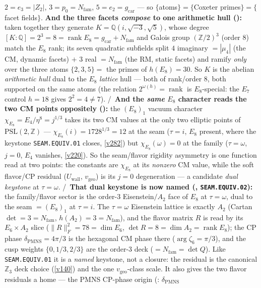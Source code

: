 \documentclass[11pt,a4paper]{article}
\newcommand{\gcar}{g_{\mathrm{car}}}
\newcommand{\Nfam}{N_{\mathrm{fam}}}
\begin{document}
$2{=}e_3{=}|Z_2|$, $3{=}p_0{=}\Nfam$, $5{=}e_2{=}\gcar$ --- so $\{$atoms$\}=\{$Coxeter primes$\}=\{$facet fields$\}$.
\textbf{And the three facets \emph{compose} to one arithmetic hull ():} taken
together they generate $K=\mathbb Q(i,\sqrt{-3},\sqrt5)$, whose degree $[K:\mathbb Q]=2^3=8=\operatorname{rank}E_8
=\gcar{+}\Nfam$ and Galois group $(\mathbb Z/2)^3$ (order $8$) match the $E_8$ rank; its seven quadratic subfields
split $4$ imaginary $=|\mu_4|$ (the CM, dynamic facets) $+$ $3$ real $=\Nfam$ (the RM, static facets) and ramify
\emph{only} over the three atoms $\{2,3,5\}=$ the primes of $h(E_8)=30$. So $K$ is the abelian \emph{arithmetic
hull} dual to the $E_8$ \emph{lattice} hull --- both of rank/order $8$, both supported on the same atoms (the
relation $2^{\omega(h)}=\operatorname{rank}$ is $E_8$-special: the $E_7$ control $h=18$ gives $2^2=4\neq7$). \mE/\mC\
\textbf{And the \emph{same} $E_8$ character reads the two CM points oppositely ():}
the $(E_8)_1$ vacuum character $\chi_{E_8}=E_4/\eta^8=j^{1/3}$ takes its two CM values at the only two elliptic points
of $\mathrm{PSL}(2,\mathbb Z)$ --- $\chi_{E_8}(i)=1728^{1/3}=12$ at the seam ($\tau{=}i$, $E_8$ present, where the
keystone \texttt{SEAM.EQUIV.01} closes, \vref{v282}) but $\chi_{E_8}(\omega)=0$ at the family ($\tau{=}\omega$,
$j{=}0$, $E_4$ vanishes, \vref{v220}). So the seam/flavor rigidity asymmetry is one function read at two points: the
constants are $\chi_{E_8}$ at its \emph{nonzero} CM value, while the soft flavor/CP residual ($U_{\mathrm{wall}}$,
$v_{\mathrm{geo}}$) is its $j{=}0$ degeneration --- a candidate \emph{dual keystone} at $\tau{=}\omega$. \mE/\mC\
\textbf{That dual keystone is now named (, \texttt{SEAM.EQUIV.02}):} the
family/flavor sector is the order-$3$ Eisenstein$/A_2$ face of $E_8$ at $\tau{=}\omega$, dual to the seam
$=(E_8)_1$ at $\tau{=}i$. The $\tau{=}\omega$ Eisenstein lattice is exactly $A_2$ (Cartan $\det=3=\Nfam$,
$h(A_2)=3=\Nfam$), and the flavor matrix $R$ is read by its $E_6{\times}A_2$ slice ($\|R\|_F^2=78=\dim E_6$,
$\det R=8=\dim A_2=\operatorname{rank}E_8$); the CP phase $\delta_{\mathrm{PMNS}}=4\pi/3$ is the hexagonal CM
phase there ($\arg\zeta_6=\pi/3$), and the cusp weights $\{0,1/3,2/3\}$ are the order-$3$ deck
($=\Nfam=\det Q$). Like \texttt{SEAM.EQUIV.01} it is a \emph{named} keystone, not a closure: the residual is the
canonical $\mathbb Z_3$ deck choice (\vref{v140}) and the one $v_{\mathrm{geo}}$-class scale. It also gives the two
flavor residuals a home --- the PMNS CP-phase origin (\veri{v406\_pmns\_phase\_origin.py}: $\delta_{\mathrm{PMNS}}$
\end{document}
